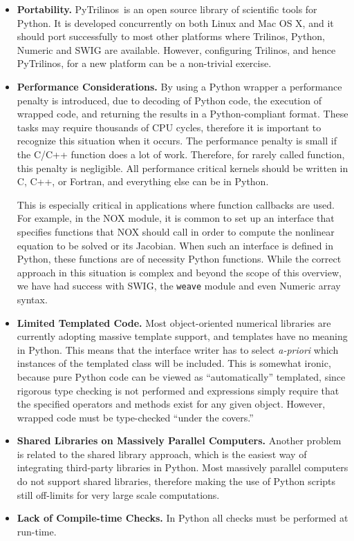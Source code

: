 \documentclass[10pt,relax]{SANDreport}
\newcommand{\PyTrilinos}{{PyTrilinos}}
\begin{document}
\begin{itemize}

\item {\bf Portability.} \PyTrilinos\ is an open source library of
  scientific tools for Python.  It is developed concurrently on both
  Linux and Mac OS X, and it should port successfully to most other
  platforms where Trilinos, Python, Numeric and SWIG are
  available. However, configuring Trilinos, and hence \PyTrilinos, for
  a new platform can be a non-trivial exercise.

\item {\bf Performance Considerations.}  By using a Python wrapper a
  performance penalty is introduced, due to decoding of Python code,
  the execution of wrapped code, and returning the results in a
  Python-compliant format. These tasks may require thousands of CPU
  cycles, therefore it is important to recognize this situation when
  it occurs.  The performance penalty is small if the C/C++ function
  does a lot of work.  Therefore, for rarely called function, this
  penalty is negligible.  All performance critical kernels should be
  written in C, C++, or Fortran, and everything else can be in Python.

  This is especially critical in applications where function callbacks
  are used.  For example, in the NOX module, it is common to set up an
  interface that specifies functions that NOX should call in order to
  compute the nonlinear equation to be solved or its Jacobian.  When
  such an interface is defined in Python, these functions are of
  necessity Python functions.  While the correct approach in this
  situation is complex and beyond the scope of this overview, we have
  had success with SWIG, the {\tt weave} module and even Numeric array
  syntax.

\item {\bf Limited Templated Code.} Most object-oriented numerical
  libraries are currently adopting massive template support, and
  templates have no meaning in Python.  This means that the interface
  writer has to select {\sl a-priori} which instances of the templated
  class will be included.  This is somewhat ironic, because pure
  Python code can be viewed as ``automatically'' templated, since
  rigorous type checking is not performed and expressions simply
  require that the specified operators and methods exist for any given
  object.  However, wrapped code must be type-checked ``under the
  covers.''

\item {\bf Shared Libraries on Massively Parallel Computers.} Another
  problem is related to the shared library approach, which is the
  easiest way of integrating third-party libraries in Python. Most
  massively parallel computers do not support shared libraries,
  therefore making the use of Python scripts still off-limits for very
  large scale computations.

\item {\bf Lack of Compile-time Checks.} In Python all checks must be
  performed at run-time.

\end{itemize}
\end{document}
